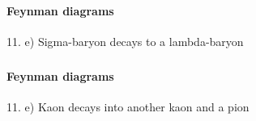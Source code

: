 \begin{frame}
\frametitle{\texorpdfstring{\culine[\sectiontitleulinecolor]{\sectiontitle}}{\sectiontitle} }
%
\framesubtitle{Feynman diagrams}

11. e) Sigma-baryon decays to a lambda-baryon


\endofslide 
\end{frame}


\begin{frame}
\frametitle{\texorpdfstring{\culine[\sectiontitleulinecolor]{\sectiontitle}}{\sectiontitle} }
%
\framesubtitle{Feynman diagrams}

11. e) Kaon decays into another kaon and a pion


\endofslide 
\end{frame}


